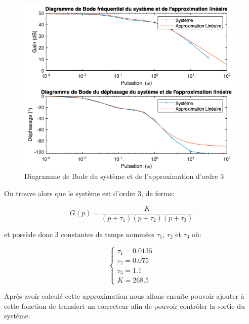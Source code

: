 \documentclass[12pt]{report}
\begin{document}
\begin{figure}[!h]
  \centering
  \includegraphics[scale=0.7]{fig/bode_diagram.png}
  \caption{Diagramme de Bode du système et de l'approximation d'ordre 3}
  \vspace{0.5cm}
\end{figure}

\FloatBarrier

On trouve alors que le système est d'ordre 3, de forme:

\vspace{0.5cm}
\begin{equation}
  G(p) = \frac{K}{(p + \tau_1)(p + \tau_2)(p + \tau_3)}
\end{equation}
\vspace{0.5cm}

et possède donc 3 constantes de temps nommées
$\tau_1$, $\tau_2$ et $\tau_3$ où:

\vspace{0.5cm}
\begin{equation}
  \left\{
  \begin{matrix}
    \tau_1 = 0.0135 \\
    \tau_2 = 0.075 \\
    \tau_3 = 1.1 \\
    K = 268.5
  \end{matrix}
  \right.
\end{equation}
\vspace{0.5cm}

Après avoir calculé cette approximation nous allons ensuite pouvoir ajouter à cette fonction de
transfert un correcteur afin de pouvoir contrôler la sortie du système.
\end{document}
